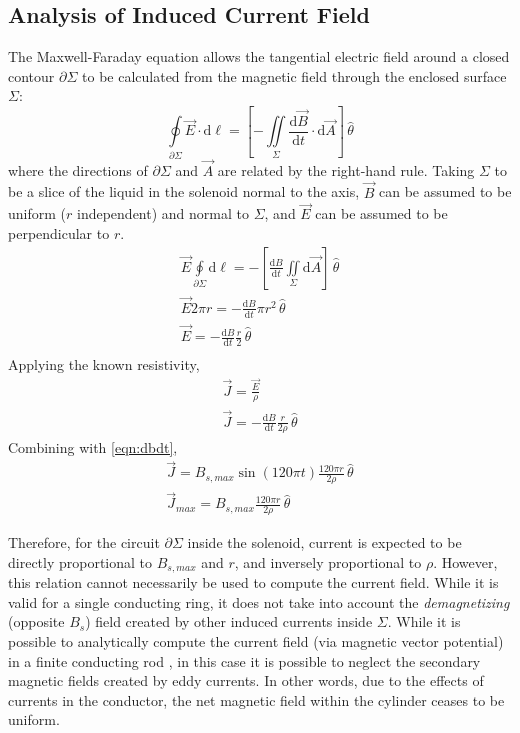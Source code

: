 \documentclass[]{article}
\begin{document}
\subsection{Analysis of Induced Current Field}
\par The Maxwell-Faraday equation allows the tangential electric field around a closed contour $\partial\Sigma$ to be calculated from the magnetic field through the enclosed surface $\Sigma$:
\begin{equation}
\oint\limits_{\partial\Sigma}\vec{E}\cdot\mathrm{d}\ell = \left[ -\iint\limits_\Sigma\frac{\mathrm{d}\vec{B}}{\mathrm{d}t}\cdot\mathrm{d}\vec{A}\right] \,\hat{\theta}
\end{equation}
where the directions of $\partial\Sigma$ and $\vec{A}$ are related by the right-hand rule. Taking $\Sigma$ to be a slice of the liquid in the solenoid normal to the axis, $\vec{B}$ can be assumed to be uniform ($r$ independent) and normal to $\Sigma$, and $\vec{E}$ can be assumed to be perpendicular to $r$. 
\begin{align}
\vec{E}\oint\limits_{\partial\Sigma}\mathrm{d}\ell=-\left[ \frac{\mathrm{d}B}{\mathrm{d}t}\iint\limits_\Sigma\mathrm{d}\vec{A}\right]\,\hat{\theta}\\
\vec{E} 2\pi r=-\frac{\mathrm{d}B}{\mathrm{d}t}\pi r^2\,\hat{\theta}\\
\vec{E}=-\frac{\mathrm{d}B}{\mathrm{d}t}\frac{r}{2}\,\hat{\theta}\\
\end{align}
Applying the known resistivity,
\begin{align}
\vec{J} = \frac{\vec{E}}{\rho}\\
\vec{J}=-\frac{\mathrm{d}B}{\mathrm{d}t}\frac{r}{2\rho}\,\hat{\theta}
\end{align}
Combining with \ref{eqn:dbdt},
\begin{align}
\vec{J}=B_{s,max}\sin(120\pi t)\frac{120\pi r}{2\rho}\,\hat{\theta}
\label{eqn:simpleJ}\\
\vec{J}_{max}=B_{s,max}\frac{120\pi r}{2\rho}\,\hat{\theta}
\label{eqn:simpleJmax}
\end{align}
\par Therefore, for the circuit $\partial\Sigma$ inside the solenoid, current is expected to be directly proportional to $B_{s,max}$ and $r$, and inversely proportional to $\rho$. However, this relation cannot necessarily be used to compute the current field. While it is valid for a single conducting ring, it does not take into account the \emph{demagnetizing} (opposite $B_{s}$) field created by other induced currents inside $\Sigma$. While it is possible to analytically compute the current field (via magnetic vector potential) in a finite conducting rod \cite{analyticeddy}, in this case it is possible to neglect the secondary magnetic fields created by eddy currents. In other words, due to the effects of currents in the conductor, the net magnetic field within the cylinder ceases to be uniform.
\end{document}
